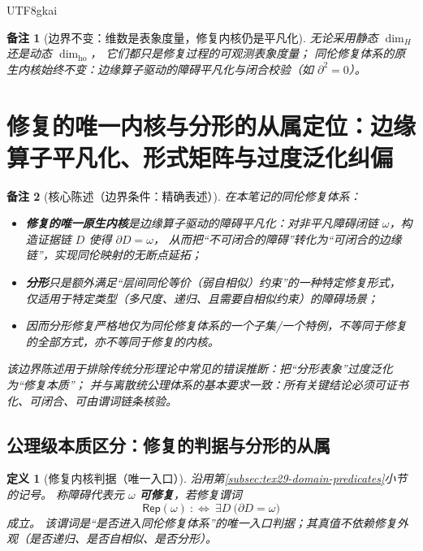 \documentclass[12pt]{article}
\newtheorem{definition}{定义}[section]
\newtheorem{remark}{备注}[section]
\newcommand{\KouJing}{\texorpdfstring{表述约定}{表述约定}}
\begin{document}
\begin{CJK*}{UTF8}{gkai}
\begin{remark}[边界不变：维数是表象度量，修复内核仍是平凡化]
无论采用静态 $\dim_H$ 还是动态 $\dim_{\mathrm{ho}}$，
它们都只是修复过程的可观测表象度量；
同伦修复体系的原生内核始终不变：边缘算子驱动的障碍平凡化与闭合校验（如 $\partial^2=0$）。
\end{remark}

\clearpage

\section{修复的唯一内核与分形的从属定位：边缘算子平凡化、形式矩阵与过度泛化纠偏}
\label{sec:tex29-ch4}

\begin{remark}[核心陈述（边界条件：精确表述）]
在本笔记的同伦修复体系：
\begin{itemize}
  \item \textbf{修复的唯一原生内核}是边缘算子驱动的障碍平凡化：对非平凡障碍闭链 $\omega$，构造证据链 $D$ 使得 $\partial D=\omega$，
  从而把“不可闭合的障碍”转化为“可闭合的边缘链”，实现同伦映射的无断点延拓；
  \item \textbf{分形}只是额外满足“层间同伦等价（弱自相似）约束”的一种特定修复形式，
  仅适用于特定类型（多尺度、递归、且需要自相似约束）的障碍场景；
  \item 因而分形修复严格地仅为同伦修复体系的一个子集/一个特例，不等同于修复的全部方式，亦不等同于修复的内核。
\end{itemize}
该边界陈述用于排除传统分形理论中常见的错误推断：把“分形表象”过度泛化为“修复本质”；
并与离散统公理体系的基本要求一致：所有关键结论必须可证书化、可闭合、可由谓词链条核验。
\end{remark}

\subsection{公理级本质区分：修复的判据与分形的从属}
\label{subsec:tex29-core-vs-fractal-positioning}

\begin{definition}[修复内核判据（唯一入口）]
沿用第\ref{subsec:tex29-domain-predicates}小节的记号。
称障碍代表元 $\omega$ \textbf{可修复}，若修复谓词
\[
  \mathsf{Rep}(\omega)\ :\Longleftrightarrow\ \exists D\ \bigl(\partial D=\omega\bigr)
\]
成立。
该谓词是“是否进入同伦修复体系”的唯一入口判据；其真值不依赖修复外观（是否递归、是否自相似、是否分形）。
\end{definition}


\end{CJK*}
\end{document}
